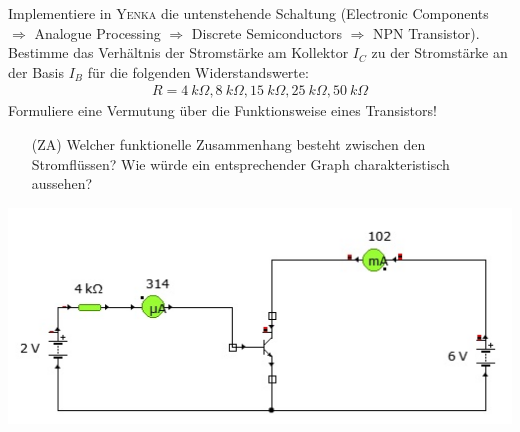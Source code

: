 \begin{Aufgabe}
Implementiere in \textsc{Yenka} die untenstehende Schaltung (Electronic Components $\Rightarrow$ Analogue Processing $\Rightarrow$ Discrete Semiconductors $\Rightarrow$ NPN Transistor).
Bestimme das Verhältnis der Stromstärke am Kollektor $I_C$ zu der Stromstärke an der Basis $I_B$ für die folgenden Widerstandswerte:
\begin{align*}
R=4~k\Omega, 8~k\Omega, 15~k\Omega, 25 ~k\Omega, 50 ~k\Omega
\end{align*}
Formuliere eine Vermutung über die Funktionsweise eines Transistors!
\begin{itemize}
\item[(ZA)] Welcher funktionelle Zusammenhang besteht zwischen den Stromflüssen? Wie würde ein entsprechender Graph charakteristisch aussehen?
\end{itemize}

\begin{center}
\includegraphics[scale=.8]{pics/transistor.jpg}
\end{center}
\end{Aufgabe}


